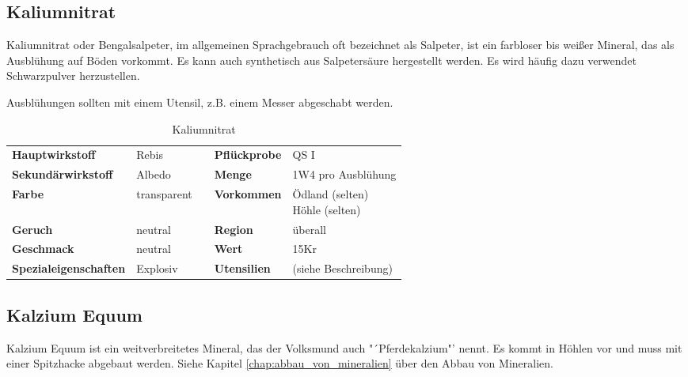 \subsection{Kaliumnitrat}
Kaliumnitrat oder Bengalsalpeter, im allgemeinen Sprachgebrauch oft bezeichnet als Salpeter, ist ein farbloser bis weißer Mineral, das als Ausblühung auf Böden vorkommt. Es kann auch synthetisch aus Salpetersäure hergestellt werden. Es wird häufig dazu verwendet Schwarzpulver herzustellen. 

Ausblühungen sollten mit einem Utensil, z.B. einem Messer abgeschabt werden.

\begin{table}[h] 
\begin{center} 
\begin{tabular}{|l|l|p{1cm}|l|l|} 
  	\cline{1-2} \cline{4-5} 
  	\textbf{Hauptwirkstoff} & Rebis && \textbf{Pflückprobe} & QS I \\ \cline{1-2} \cline{4-5} 
  	\textbf{Sekundärwirkstoff} & Albedo && \textbf{Menge} & 1W4 pro Ausblühung \\ \cline{1-2} \cline{4-5} 
  	\textbf{Farbe} & transparent && \textbf{Vorkommen} & \brcell{Ödland (selten) \\ Höhle (selten)} \\ \cline{1-2} \cline{4-5} 
  	\textbf{Geruch} & neutral && \textbf{Region} & überall \\ \cline{1-2} \cline{4-5} 
  	\textbf{Geschmack} & neutral && \textbf{Wert} & 15Kr \\ \cline{1-2} \cline{4-5} 
  	\textbf{Spezialeigenschaften} & Explosiv && \textbf{Utensilien} & (siehe Beschreibung) \\ \cline{1-2} \cline{4-5} 
\end{tabular} 
\end{center} 
\caption{Kaliumnitrat} 
\label{tab:kaliumnitrat} 
\end{table}


\subsection{Kalzium Equum}
Kalzium Equum ist ein weitverbreitetes Mineral, das der Volksmund auch "´Pferdekalzium"' nennt. Es kommt in Höhlen vor und muss mit einer Spitzhacke abgebaut werden. Siehe Kapitel \ref{chap:abbau_von_mineralien} über den Abbau von Mineralien.

